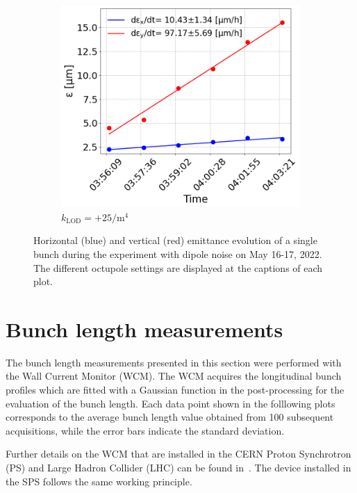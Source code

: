 \begin{figure}[htp]
\begin{subfigure}{.45\textwidth}
        \centering
        \includegraphics[width=.95\linewidth]{images/app_c/emit_vs_time_Set1_coast7.png}  
        \caption{$k_\mathrm{LOD}=+25  \mathrm{/m^{4}}$}
\end{subfigure}
    \caption{Horizontal (blue) and vertical (red) emittance evolution of a single bunch during the experiment with dipole noise on May 16-17, 2022.  The different octupole settings are displayed at the captions of each plot.}
    \label{fig:dipole_noise_md_2022_overview_plots_klod_scan}
 \end{figure}
 
 
\newpage
 \section{Bunch length measurements}\label{sec:bunch_length_meas_2022}
 The bunch length measurements presented in this section were performed with the Wall Current Monitor (WCM). The WCM acquires the longitudinal bunch profiles which are fitted with a Gaussian function in the post-processing for the evaluation of the bunch length. Each data point shown in the folllowing plots corresponds to the average bunch length value obtained from 100 subsequent acquisitions, while the error bars indicate the standard deviation.

 Further details on the WCM that are installed in the CERN Proton Synchrotron (PS) and Large Hadron Collider (LHC) can be found in~\cite{Belleman:2313362, Argyropoulos:2752314}. The device installed in the SPS follows the same working principle. 


